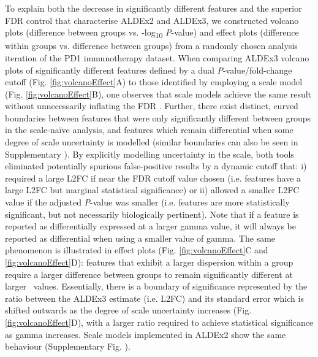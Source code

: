 \documentclass[10pt,letterpaper]{article}
\begin{document}
To explain both the decrease in significantly different features and the superior FDR control that characterise ALDEx2 and ALDEx3, we constructed volcano plots \cite{Cui:2003aa} (difference between groups vs. -log\textsubscript{10} \textit{P}-value) and effect plots \cite{gloor:effect} (difference within groups vs. difference between groups) from a randomly chosen analysis iteration of the PD1 immunotherapy dataset. When comparing ALDEx3 volcano plots of significantly different features defined by a dual \textit{P}-value/fold-change cutoff (Fig. \ref{fig:volcanoEffect}A) to those identified by employing a scale model (Fig. \ref{fig:volcanoEffect}B), one observes that scale models achieve the same result without unnecessarily inflating the FDR \cite{ebrahimpoor_inflated_2021}. Further, there exist distinct, curved boundaries between features that were only significantly different between groups in the scale-na\"ive analysis, and features which remain differential when some degree of scale uncertainty is modelled (similar boundaries can also be seen in Supplementary ). By explicitly modelling uncertainty in the scale, both tools eliminated potentially spurious false-positive results by a dynamic cutoff that: i) required a large L2FC if near the FDR cutoff value chosen (i.e. features have a large L2FC but marginal statistical significance) or ii) allowed a smaller L2FC value if the adjusted \textit{P}-value was smaller (i.e. features are more statistically significant, but not necessarily biologically pertinent). Note that if a feature is reported as differentially expressed at a larger gamma value, it will always be reported as differential when using a smaller value of gamma. The same phenomenon is illustrated in effect plots (Fig. \ref{fig:volcanoEffect}C and \ref{fig:volcanoEffect}D): features that exhibit a larger dispersion within a group require a larger difference between groups to remain significantly different at larger \textgamma~values. Essentially, there is a boundary of significance represented by the ratio between the ALDEx3 estimate (i.e. L2FC) and its standard error which is shifted outwards as the degree of scale uncertainty increases (Fig. \ref{fig:volcanoEffect}D), with a larger ratio required to achieve statistical significance as gamma increases. Scale models implemented in ALDEx2 show the same behaviour (Supplementary Fig. ).
\end{document}

